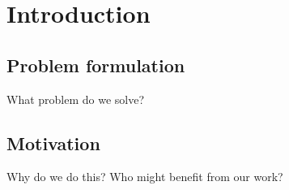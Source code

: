 \section{Introduction}

\subsection{Problem formulation}
What problem do we solve?


\subsection{Motivation}

Why do we do this?
Who might benefit from our work?
